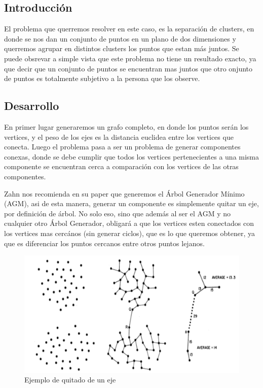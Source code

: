 \subsection{Introducción}

El problema que querremos resolver en este caso, es la separación de clusters, en donde se nos dan un conjunto de puntos en un plano de dos dimensiones y querremos agrupar en distintos clusters los puntos que estan más juntos. Se puede obsrevar a simple vista que este problema no tiene un resultado exacto, ya que decir que un conjunto de puntos se encuentran mas juntos que otro onjunto de puntos es totalmente subjetivo a la persona que los observe. 




\subsection{Desarrollo}

En primer lugar generaremos un grafo completo, en donde los puntos serán los vertices, y el peso de los ejes es la distancia euclidea entre los vertices que conecta. Luego el problema pasa a ser un problema de generar componentes conexas, donde se debe cumplir que todos los vertices pertenecientes a una misma componente se encuentran cerca a comparación con los vertices de las otras componentes.

Zahn nos recomienda en su paper que generemos el Árbol Generador Mínimo (AGM), asi de esta manera, generar un componente es simplemente quitar un eje, por definición de árbol. No solo eso, sino que además al ser el AGM y no cualquier otro Árbol Generador, obligará a que los vertices esten conectados con los vertices mas cercános (sin generar ciclos), que es lo que queremos obtener, ya que es diferenciar los puntos cercanos entre otros puntos lejanos.


\begin{figure}[H]
  \begin{center}
    \includegraphics[scale=0.45]{img/agm_demo.pdf}
    \caption{Ejemplo de quitado de un eje}
    \label{arbol_muestra}
  \end{center}
\end{figure}




